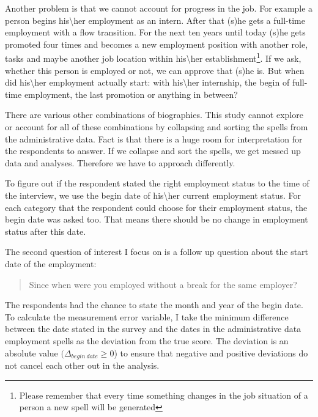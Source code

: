 Another problem is that we cannot account for progress in the job. For example a person begins his\textbackslash her employment as an intern. After that (s)he gets a full-time employment with a flow transition. For the next ten years until today (s)he gets promoted four times and becomes a new employment position with another role, tasks and maybe another job location within his\textbackslash her establishment\footnote{Please remember that every time something changes in the job situation of a person a new spell will be generated}. If we ask, whether this person is employed or not, we can approve that (s)he is. But when did his\textbackslash her employment actually start: with his\textbackslash her internship, the begin of full-time employment, the last promotion or anything in between?

There are various other combinations of biographies. This study cannot explore or account for all of these combinations by collapsing and sorting the spells from the administrative data. Fact is that there is a huge room for interpretation for the respondents to answer. If we collapse and sort the spells, we get messed up data and analyses. Therefore we have to approach differently.

To figure out if the respondent stated the right employment status to the time of the interview, we use the begin date of his\textbackslash her current employment status. For each category that the respondent could choose for their employment status, the begin date was asked too. That means there should be no change in employment status after this date.

The second question of interest I focus on is a follow up question about the start date of the employment:


\begin{quote}
\begin {small}

Since when were you employed without a break for the same employer?

\end{small}
\end{quote}

The respondents had the chance to state the month and year of the begin date. To calculate the measurement error variable, I take the minimum difference between the date stated in the survey and the dates in the administrative data employment spells as the deviation from the true score. The deviation is an absolute value \((\Delta_{begin \ date}\geq0\)) to ensure that negative and positive deviations do not cancel each other out in the analysis.

